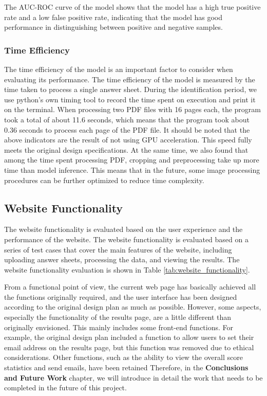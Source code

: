 \documentclass[twocolumn]{article}
\begin{document}
    The AUC-ROC curve of the model shows that the model has a high true positive rate and a low false positive rate, indicating that the model has good performance in distinguishing between positive and negative samples.

    \subsubsection{Time Efficiency}
    The time efficiency of the model is an important factor to consider when evaluating its performance. The time efficiency of the model is measured by the time taken to process a single answer sheet. During the identification period, we use python's own timing tool to record the time spent on execution and print it on the terminal. When processing two PDF files with 16 pages each, the program took a total of about 11.6 seconds, which means that the program took about 0.36 seconds to process each page of the PDF file. It should be noted that the above indicators are the result of not using GPU acceleration. This speed fully meets the original design specifications. At the same time, we also found that among the time spent processing PDF, cropping and preprocessing take up more time than model inference. This means that in the future, some image processing procedures can be further optimized to reduce time complexity. 

    \subsection{Website Functionality}
    The website functionality is evaluated based on the user experience and the performance of the website. The website functionality is evaluated based on a series of test cases that cover the main features of the website, including uploading answer sheets, processing the data, and viewing the results. The website functionality evaluation is shown in Table \ref{tab:website_functionality}.

    From a functional point of view, the current web page has basically achieved all the functions originally required, and the user interface has been designed according to the original design plan as much as possible. However, some aspects, especially the functionality of the results page, are a little different than originally envisioned. This mainly includes some front-end functions. For example, the original design plan included a function to allow users to set their email address on the results page, but this function was removed due to ethical considerations. Other functions, such as the ability to view the overall score statistics and send emails, have been retained Therefore, in the \textbf{Conclusions and Future Work} chapter, we will introduce in detail the work that needs to be completed in the future of this project.
\end{document}
